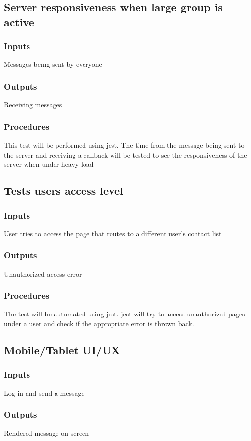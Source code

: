 \documentclass[12pt, titlepage]{article}
\begin{document}
\subsection{Server responsiveness when large group is active}
\subsubsection{Inputs}
Messages being sent by everyone
\subsubsection{Outputs}
Receiving messages
\subsubsection{Procedures}
This test will be performed using jest. The time from the message being sent to the server and receiving a callback will be tested to see the responsiveness of the server when under heavy load
\subsection{Tests users access level}
\subsubsection{Inputs}
User tries to access the page that routes to a different user's contact list
\subsubsection{Outputs}
Unauthorized access error
\subsubsection{Procedures}
The test will be automated using jest. jest will try to access unauthorized pages under a user and check if the appropriate error is thrown back.
\subsection{Mobile/Tablet UI/UX}
\subsubsection{Inputs}
Log-in and send a message
\subsubsection{Outputs}
Rendered message on screen
\end{document}
